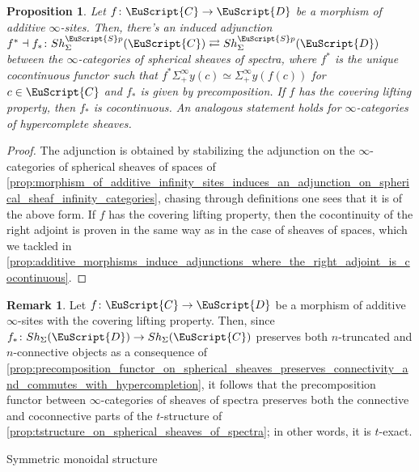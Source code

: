 \documentclass[oneside,a4paper]{amsart}
\makeatletter
\newcommand{\euscr}[1]{\EuScript{#1}} %
\newcommand{\ccat}{\euscr{C}} %
\newcommand{\dcat}{\euscr{D}} %
\newcommand{\spectra}{\euscr{S}p} %
\newcommand{\sigmainfty}{\Sigma^{\infty}_{+}} %
\theoremstyle{plain}
\newtheorem{prop}[thm]{Proposition}
\theoremstyle{definition}
\newtheorem{rem}[thm]{Remark}
\theoremstyle{remark}
\def\subsection{\@startsection{subsection}{1}%
  \z@{.7\linespacing\@plus\linespacing}{.5\linespacing}%
  {\normalfont\bfseries\centering}}%
\makeatother
\begin{document}
\begin{prop}
\label{prop:additive_morphisms_induce_adjunctions_on_infty_categories_of_sheaves_of_spectra}
Let $f \colon \ccat \rightarrow \dcat$ be a morphism of additive $\infty$-sites. Then, there's an induced adjunction $f^{*} \dashv f_{*} \colon Sh_{\Sigma}^{\spectra}(\ccat) \rightleftarrows Sh_{\Sigma}^{\spectra}(\dcat)$ between the $\infty$-categories of spherical sheaves of spectra, where $f^{*}$ is the unique cocontinuous functor such that $f^{*} \sigmainfty y(c) \simeq \sigmainfty y(f(c))$ for $c \in \ccat$ and $f_{*}$ is given by precomposition. If $f$ has the covering lifting property, then $f_{*}$ is cocontinuous. An analogous statement holds for $\infty$-categories of hypercomplete sheaves. 
\end{prop}

\begin{proof}
The adjunction is obtained by stabilizing the adjunction on the $\infty$-categories of spherical sheaves of spaces of \cref{prop:morphism_of_additive_infinity_sites_induces_an_adjunction_on_spherical_sheaf_infinity_categories}, chasing through definitions one sees that it is of the above form.  If $f$ has the covering lifting property, then the cocontinuity of the right adjoint is proven in the same way as in the case of sheaves of spaces, which we tackled in \cref{prop:additive_morphisms_induce_adjunctions_where_the_right_adjoint_is_cocontinuous}.
\end{proof}

\begin{rem}
\label{rem:right_adjoint_on_infinity_categories_of_sheaves_of_spectra_preserves_connectivity}
Let $f \colon \ccat \rightarrow \dcat$ be a morphism of additive $\infty$-sites with the covering lifting property. Then, since $f_{*} \colon Sh_{\Sigma}(\dcat) \rightarrow Sh_{\Sigma}(\ccat)$ preserves both $n$-truncated and $n$-connective objects as a consequence of \cref{prop:precomposition_functor_on_spherical_sheaves_preserves_connectivity_and_commutes_with_hypercompletion}, it follows that the precomposition functor between $\infty$-categories of sheaves of spectra preserves both the connective and coconnective parts of the $t$-structure of \cref{prop:tstructure_on_spherical_sheaves_of_spectra}; in other words, it is $t$-exact.  
\end{rem}

\subsection{Symmetric monoidal structure}
\end{document}
